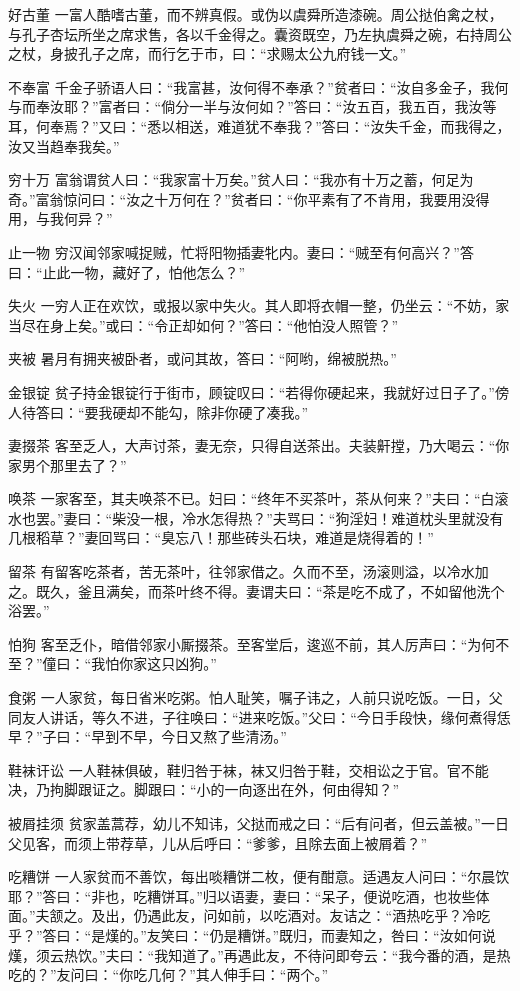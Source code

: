 \documentclass[12pt,UTF8]{ctexbook}
\begin{document}
好古董
一富人酷嗜古董，而不辨真假。或伪以虞舜所造漆碗。周公挞伯禽之杖，与孔子杏坛所坐之席求售，各以千金得之。囊资既空，乃左执虞舜之碗，右持周公之杖，身披孔子之席，而行乞于市，曰：“求赐太公九府钱一文。”

不奉富
千金子骄语人曰：“我富甚，汝何得不奉承？”贫者曰：“汝自多金子，我何与而奉汝耶？”富者曰：“倘分一半与汝何如？”答曰：“汝五百，我五百，我汝等耳，何奉焉？”又曰：“悉以相送，难道犹不奉我？”答曰：“汝失千金，而我得之，汝又当趋奉我矣。”

穷十万
富翁谓贫人曰：“我家富十万矣。”贫人曰：“我亦有十万之蓄，何足为奇。”富翁惊问曰：“汝之十万何在？”贫者曰：“你平素有了不肯用，我要用没得用，与我何异？”

止一物
穷汉闻邻家喊捉贼，忙将阳物插妻牝内。妻曰：“贼至有何高兴？”答曰：“止此一物，藏好了，怕他怎么？”

失火
一穷人正在欢饮，或报以家中失火。其人即将衣帽一整，仍坐云：“不妨，家当尽在身上矣。”或曰：“令正却如何？”答曰：“他怕没人照管？”

夹被
暑月有拥夹被卧者，或问其故，答曰：“阿哟，绵被脱热。”

金银锭
贫子持金银锭行于街市，顾锭叹曰：“若得你硬起来，我就好过日子了。”傍人待答曰：“要我硬却不能勾，除非你硬了凑我。”

妻掇茶
客至乏人，大声讨茶，妻无奈，只得自送茶出。夫装鼾摚，乃大喝云：“你家男个那里去了？”

唤茶
一家客至，其夫唤茶不已。妇曰：“终年不买茶叶，茶从何来？”夫曰：“白滚水也罢。”妻曰：“柴没一根，冷水怎得热？”夫骂曰：“狗淫妇！难道枕头里就没有几根稻草？”妻回骂曰：“臭忘八！那些砖头石块，难道是烧得着的！”

留茶
有留客吃茶者，苦无茶叶，往邻家借之。久而不至，汤滚则溢，以冷水加之。既久，釜且满矣，而茶叶终不得。妻谓夫曰：“茶是吃不成了，不如留他洗个浴罢。”

怕狗
客至乏仆，暗借邻家小厮掇茶。至客堂后，逡巡不前，其人厉声曰：“为何不至？”僮曰：“我怕你家这只凶狗。”

食粥
一人家贫，每日省米吃粥。怕人耻笑，嘱子讳之，人前只说吃饭。一日，父同友人讲话，等久不进，子往唤曰：“进来吃饭。”父曰：“今日手段快，缘何煮得恁早？”子曰：“早到不早，今日又熬了些清汤。”

鞋袜讦讼
一人鞋袜俱破，鞋归咎于袜，袜又归咎于鞋，交相讼之于官。官不能决，乃拘脚跟证之。脚跟曰：“小的一向逐出在外，何由得知？”

被屑挂须
贫家盖蒿荐，幼儿不知讳，父挞而戒之曰：“后有问者，但云盖被。”一日父见客，而须上带荐草，儿从后呼曰：“爹爹，且除去面上被屑着？”

吃糟饼
一人家贫而不善饮，每出啖糟饼二枚，便有酣意。适遇友人问曰：“尔晨饮耶？”答曰：“非也，吃糟饼耳。”归以语妻，妻曰：“呆子，便说吃酒，也妆些体面。”夫颔之。及出，仍遇此友，问如前，以吃酒对。友诘之：“酒热吃乎？冷吃乎？”答曰：“是熯的。”友笑曰：“仍是糟饼。”既归，而妻知之，咎曰：“汝如何说熯，须云热饮。”夫曰：“我知道了。”再遇此友，不待问即夸云：“我今番的酒，是热吃的？”友问曰：“你吃几何？”其人伸手曰：“两个。”
\end{document}
